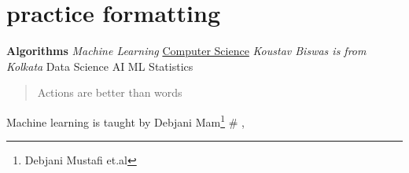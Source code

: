 \documentclass{article}
\begin{document}
	\section{practice formatting}
	\textbf{
	Algorithms}
	\textit{Machine Learning}\newline
	\underline{Computer Science}
	\textit{Koustav Biswas is from \emph{Kolkata}} \newline
	\small Data Science \newline
	\large AI
	\Large ML
	\huge Statistics
	\begin{quote}
		\centering
		Actions are better than words \newline
	\end{quote}
	\small Machine learning is taught by Debjani Mam\footnote{Debjani Mustafi et.al }\newline
	\# ,\*
\end{document}
